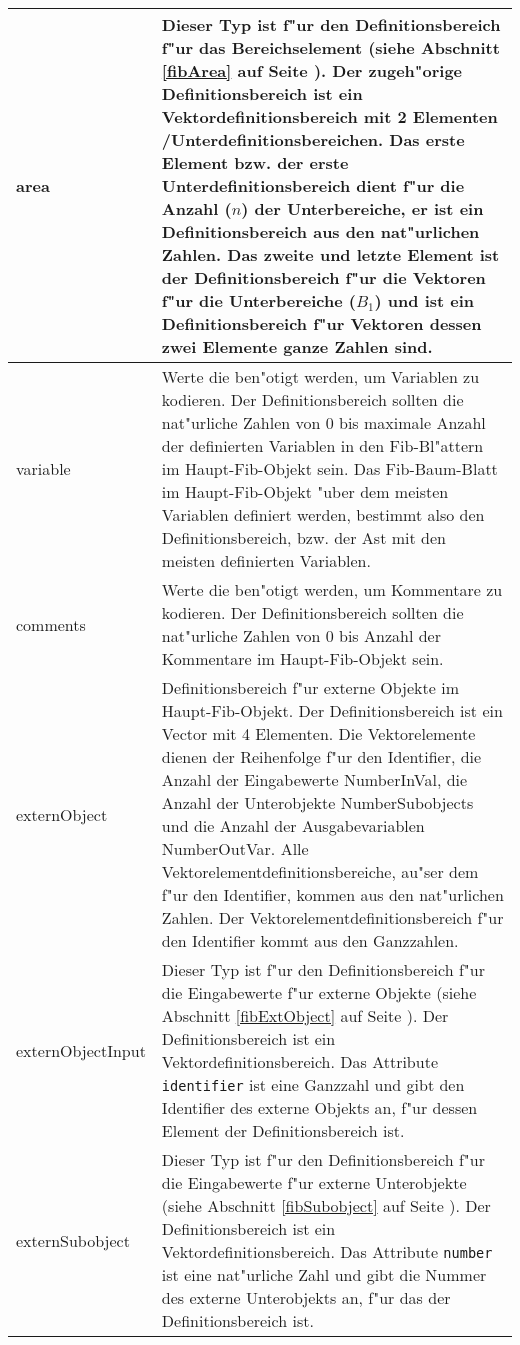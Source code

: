 \begin{center}
\begin{longtable}{|p{25mm}|p{100mm}|}
	area & Dieser Typ ist f"ur den Definitionsbereich f"ur das Bereichselement (siehe Abschnitt \ref{fibArea} auf Seite \pageref{fibArea}). Der zugeh"orige Definitionsbereich ist ein Vektordefinitionsbereich mit 2 Elementen /Unterdefinitionsbereichen. Das erste Element bzw. der erste Unterdefinitionsbereich dient f"ur die Anzahl ($n$) der Unterbereiche, er ist ein Definitionsbereich aus den nat"urlichen Zahlen. Das zweite und letzte Element ist der Definitionsbereich f"ur die Vektoren f"ur die Unterbereiche ($B_{1}$) und ist ein Definitionsbereich f"ur Vektoren dessen zwei Elemente ganze Zahlen sind. \\\hline
	variable & Werte die ben"otigt werden, um Variablen zu kodieren. Der Definitionsbereich sollten die nat"urliche Zahlen von 0 bis maximale Anzahl der definierten Variablen in den Fib-Bl"attern im Haupt-Fib-Objekt sein. Das Fib-Baum-Blatt im Haupt-Fib-Objekt "uber dem meisten Variablen definiert werden, bestimmt also den Definitionsbereich, bzw. der Ast mit den meisten definierten Variablen.\\\hline
	comments & Werte die ben"otigt werden, um Kommentare zu kodieren. Der Definitionsbereich sollten die nat"urliche Zahlen von 0 bis Anzahl der Kommentare im Haupt-Fib-Objekt sein.\\\hline
	externObject & Definitionsbereich f"ur externe Objekte im Haupt-Fib-Objekt. Der Definitionsbereich ist ein Vector mit 4 Elementen. Die Vektorelemente dienen der Reihenfolge f"ur den Identifier, die Anzahl der Eingabewerte NumberInVal, die Anzahl der Unterobjekte NumberSubobjects und die Anzahl der Ausgabevariablen NumberOutVar. Alle Vektorelementdefinitionsbereiche, au"ser dem f"ur den Identifier, kommen aus den nat"urlichen Zahlen. Der Vektorelementdefinitionsbereich f"ur den Identifier kommt aus den Ganzzahlen.\\\hline
	externObjectInput & Dieser Typ ist f"ur den Definitionsbereich f"ur die Eingabewerte f"ur externe Objekte (siehe Abschnitt \ref{fibExtObject} auf Seite \pageref{fibExtObject}). Der Definitionsbereich ist ein Vektordefinitionsbereich. Das Attribute \verb|identifier| ist eine Ganzzahl und gibt den Identifier des externe Objekts an, f"ur dessen Element der Definitionsbereich ist.\\\hline
	externSubobject & Dieser Typ ist f"ur den Definitionsbereich f"ur die Eingabewerte f"ur externe Unterobjekte (siehe Abschnitt \ref{fibSubobject} auf Seite \pageref{fibSubobject}). Der Definitionsbereich ist ein Vektordefinitionsbereich. Das Attribute \verb|number| ist eine nat"urliche Zahl und gibt die Nummer des externe Unterobjekts an, f"ur das der Definitionsbereich ist.\\\hline

\end{longtable}
\end{center}

